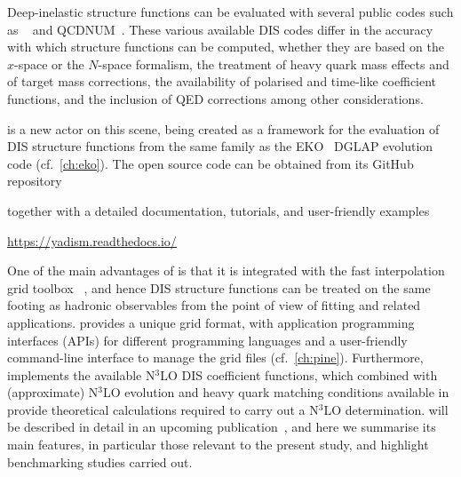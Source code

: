 
Deep-inelastic structure functions can be evaluated with several public codes
such as \apfel~\cite{Bertone:2013vaa} and \textsc{\small
QCDNUM}~\cite{Botje:2010ay}.
%
These various available DIS codes differ in the accuracy with which structure
functions can be computed, whether they are based on the $x$-space or the
$N$-space formalism, the treatment of heavy quark mass effects and of target
mass corrections, the availability of polarised and time-like coefficient
functions, and the inclusion of QED corrections among  other considerations.

\yadism is a new actor on this scene, being created as a framework for the
evaluation of DIS structure functions from the same family as the
\textsc{\small EKO}~\cite{Candido:2022tld} DGLAP evolution code (cf.\
\cref{ch:eko}).
%
The open source \yadism code can be obtained from its GitHub repository
\begin{center}
\end{center}  
together with a detailed documentation, tutorials, and user-friendly examples
\begin{center}
  \url{https://yadism.readthedocs.io/}
\end{center}  
One of the main advantages of \yadism is that it is integrated with the fast
interpolation grid toolbox \pineappl~\cite{Carrazza:2020gss},
and hence DIS structure functions can be treated on the same footing as
hadronic observables from the point of view of \pdf{} fitting and related
applications.
%
\pineappl provides a unique grid format, with application programming
interfaces (APIs) for different programming languages and a user-friendly
command-line interface to manage the grid files (cf.\ \cref{ch:pine}).
%
Furthermore, \yadism implements the available N$^3$LO DIS coefficient
functions, which combined with (approximate)  N$^3$LO evolution and heavy quark
matching conditions available in \eko provide theoretical
calculations required to carry out a N$^3$LO \pdf{} determination.
%
\yadism will be described in detail in an upcoming publication~\cite{yadism},
and here we summarise its main features, in particular those relevant to the
present study, and highlight benchmarking studies carried out.

